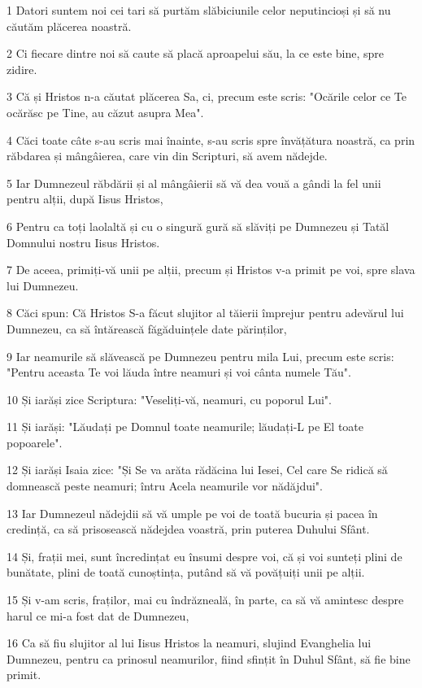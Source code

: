 \par 1 Datori suntem noi cei tari să purtăm slăbiciunile celor neputincioși și să nu căutăm plăcerea noastră.
\par 2 Ci fiecare dintre noi să caute să placă aproapelui său, la ce este bine, spre zidire.
\par 3 Că și Hristos n-a căutat plăcerea Sa, ci, precum este scris: "Ocările celor ce Te ocărăsc pe Tine, au căzut asupra Mea".
\par 4 Căci toate câte s-au scris mai înainte, s-au scris spre învățătura noastră, ca prin răbdarea și mângâierea, care vin din Scripturi, să avem nădejde.
\par 5 Iar Dumnezeul răbdării și al mângâierii să vă dea vouă a gândi la fel unii pentru alții, după Iisus Hristos,
\par 6 Pentru ca toți laolaltă și cu o singură gură să slăviți pe Dumnezeu și Tatăl Domnului nostru Iisus Hristos.
\par 7 De aceea, primiți-vă unii pe alții, precum și Hristos v-a primit pe voi, spre slava lui Dumnezeu.
\par 8 Căci spun: Că Hristos S-a făcut slujitor al tăierii împrejur pentru adevărul lui Dumnezeu, ca să întărească făgăduințele date părinților,
\par 9 Iar neamurile să slăvească pe Dumnezeu pentru mila Lui, precum este scris: "Pentru aceasta Te voi lăuda între neamuri și voi cânta numele Tău".
\par 10 Și iarăși zice Scriptura: "Veseliți-vă, neamuri, cu poporul Lui".
\par 11 Și iarăși: "Lăudați pe Domnul toate neamurile; lăudați-L pe El toate popoarele".
\par 12 Și iarăși Isaia zice: "Și Se va arăta rădăcina lui Iesei, Cel care Se ridică să domnească peste neamuri; întru Acela neamurile vor nădăjdui".
\par 13 Iar Dumnezeul nădejdii să vă umple pe voi de toată bucuria și pacea în credință, ca să prisosească nădejdea voastră, prin puterea Duhului Sfânt.
\par 14 Și, frații mei, sunt încredințat eu însumi despre voi, că și voi sunteți plini de bunătate, plini de toată cunoștința, putând să vă povățuiți unii pe alții.
\par 15 Și v-am scris, fraților, mai cu îndrăzneală, în parte, ca să vă amintesc despre harul ce mi-a fost dat de Dumnezeu,
\par 16 Ca să fiu slujitor al lui Iisus Hristos la neamuri, slujind Evanghelia lui Dumnezeu, pentru ca prinosul neamurilor, fiind sfințit în Duhul Sfânt, să fie bine primit.
